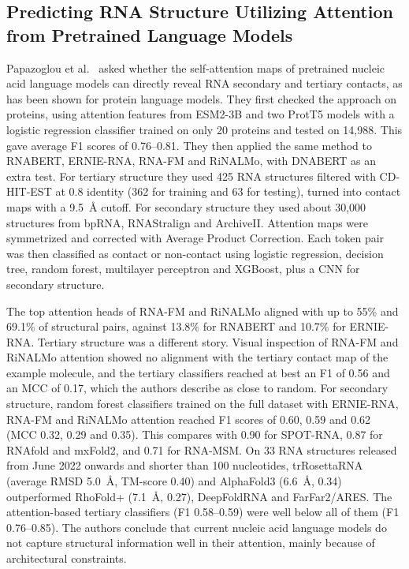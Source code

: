 \documentclass{FastFyp}
\begin{document}
\subsection{Predicting RNA Structure Utilizing Attention from Pretrained Language Models}
Papazoglou et al.\ \cite{ref:Papazoglou:2025} asked whether the self-attention maps of pretrained nucleic acid language models can directly reveal RNA secondary and tertiary contacts, as has been shown for protein language models. They first checked the approach on proteins, using attention features from ESM2-3B and two ProtT5 models with a logistic regression classifier trained on only 20 proteins and tested on 14,988. This gave average F1 scores of 0.76--0.81. They then applied the same method to RNABERT, ERNIE-RNA, RNA-FM and RiNALMo, with DNABERT as an extra test. For tertiary structure they used 425 RNA structures filtered with CD-HIT-EST at 0.8 identity (362 for training and 63 for testing), turned into contact maps with a 9.5~\AA{} cutoff. For secondary structure they used about 30,000 structures from bpRNA, RNAStralign and ArchiveII. Attention maps were symmetrized and corrected with Average Product Correction. Each token pair was then classified as contact or non-contact using logistic regression, decision tree, random forest, multilayer perceptron and XGBoost, plus a CNN for secondary structure.

The top attention heads of RNA-FM and RiNALMo aligned with up to 55\% and 69.1\% of structural pairs, against 13.8\% for RNABERT and 10.7\% for ERNIE-RNA. Tertiary structure was a different story. Visual inspection of RNA-FM and RiNALMo attention showed no alignment with the tertiary contact map of the example molecule, and the tertiary classifiers reached at best an F1 of 0.56 and an MCC of 0.17, which the authors describe as close to random. For secondary structure, random forest classifiers trained on the full dataset with ERNIE-RNA, RNA-FM and RiNALMo attention reached F1 scores of 0.60, 0.59 and 0.62 (MCC 0.32, 0.29 and 0.35). This compares with 0.90 for SPOT-RNA, 0.87 for RNAfold and mxFold2, and 0.71 for RNA-MSM. On 33 RNA structures released from June 2022 onwards and shorter than 100 nucleotides, trRosettaRNA (average RMSD 5.0~\AA{}, TM-score 0.40) and AlphaFold3 (6.6~\AA{}, 0.34) outperformed RhoFold+ (7.1~\AA{}, 0.27), DeepFoldRNA and FarFar2/ARES. The attention-based tertiary classifiers (F1 0.58--0.59) were well below all of them (F1 0.76--0.85). The authors conclude that current nucleic acid language models do not capture structural information well in their attention, mainly because of architectural constraints.
\end{document}
